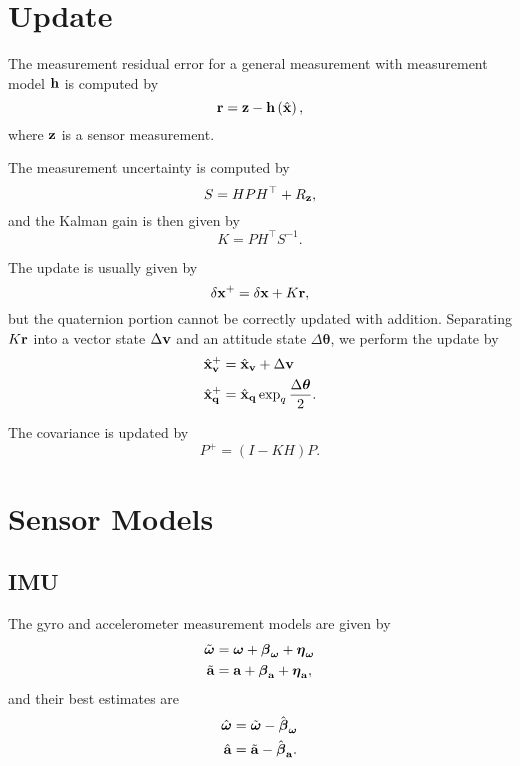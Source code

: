 \documentclass[english]{article}
\begin{document}
\section{Update}

The measurement residual error for a general measurement with measurement model ${\bf h}$ is computed by
\begin{equation}
{\bf r} = {\bf z} - {\bf h}\left(\hat{{\bf x}}\right),
\end{equation}
where ${\bf z}$ is a sensor measurement.

The measurement uncertainty is computed by
\begin{equation}
S = HPH^\top + R_{\bf z},
\end{equation}
and the Kalman gain is then given by
\begin{equation}
K = PH^\top S^{-1}.
\end{equation}

The update is usually given by
\begin{equation}
\delta {\bf x}^+ = \delta {\bf x} + K{\bf r},
\end{equation}
but the quaternion portion cannot be correctly updated with addition. Separating $K{\bf r}$ into a vector state $\Delta{\bf v}$ and an attitude state $\Delta{\boldsymbol \theta}$, we perform the update by
\begin{align}
\hat{{\bf x}}_{\bf v}^+ & = \hat{{\bf x}}_{\bf v} + \Delta{\bf v} \\
\hat{{\bf x}}_{\bf q}^+ & = \hat{{\bf x}}_{\bf q}\exp_q{\frac{\Delta{\boldsymbol \theta}}{2}}.
\end{align}

The covariance is updated by
\begin{equation}
P^+ = \left( I - KH \right) P.
\end{equation}



\section{Sensor Models}

\subsection{IMU}

The gyro and accelerometer measurement models are given by
\begin{align}
\tilde{\boldsymbol{\omega}} & = \boldsymbol{\omega} + \boldsymbol{\beta}_{\boldsymbol{\omega}} + \boldsymbol{\eta}_{\boldsymbol{\omega}} \\
\tilde{\bf{a}} & = {\bf{a}} + \boldsymbol{\beta}_{\bf{a}} + \boldsymbol{\eta}_{\bf{a}},
\end{align}
and their best estimates are
\begin{align}
\hat{\boldsymbol{\omega}} & = \tilde{\boldsymbol{\omega}} - \hat{\boldsymbol{\beta}}_{\boldsymbol{\omega}} \\
\hat{\bf{a}} & = \tilde{\bf{a}} - \hat{\boldsymbol{\beta}}_{\bf{a}}.
\end{align}
\end{document}
